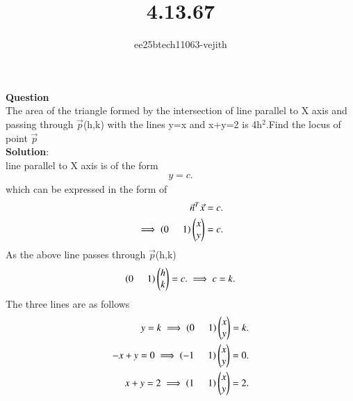 \documentclass[journal]{IEEEtran}
\begin{document}

\vspace{3cm}

\title{4.13.67}
\author{ee25btech11063-vejith}

\maketitle
{\let\newpage\relax\maketitle}
\renewcommand{\thefigure}{\theenumi}
\renewcommand{\thetable}{\theenumi}
\setlength{\intextsep}{10pt} %
\textbf{Question}\\
The area of the triangle formed by the intersection of line parallel to X axis and passing through $\Vec{p}$(h,k) with the lines y=x and x+y=2 is 4h$^2$.Find the locus of point $\Vec{p}$\\
\textbf{Solution}:\\
line parallel to X axis is of the form 
\begin{align}
    y=c.
\end{align}
which can be expressed in the form of 
\begin{align}
    \Vec{n}^T\Vec{x}=c.\\
     \implies \left(0\hspace{0.5cm}1\right)\begin{pmatrix}x\\y\end{pmatrix}=c.
\end{align}
As the above line passes through $\Vec{p}$(h,k)
\begin{align}
     \left(0\hspace{0.5cm}1\right)\begin{pmatrix}h\\k\end{pmatrix}=c.
     \implies c=k.
\end{align}
The three lines are as follows
\begin{align}
    y=k\implies \left(0\hspace{0.5cm}1\right)\begin{pmatrix}x\\y\end{pmatrix}=k.\\
    -x+y=0 \implies \left(-1\hspace{0.5cm}1\right)\begin{pmatrix}x\\y\end{pmatrix}=0.\\
    x+y=2 \implies \left(1\hspace{0.5cm}1\right)\begin{pmatrix}x\\y\end{pmatrix}=2.
\end{align}
\end{document}
